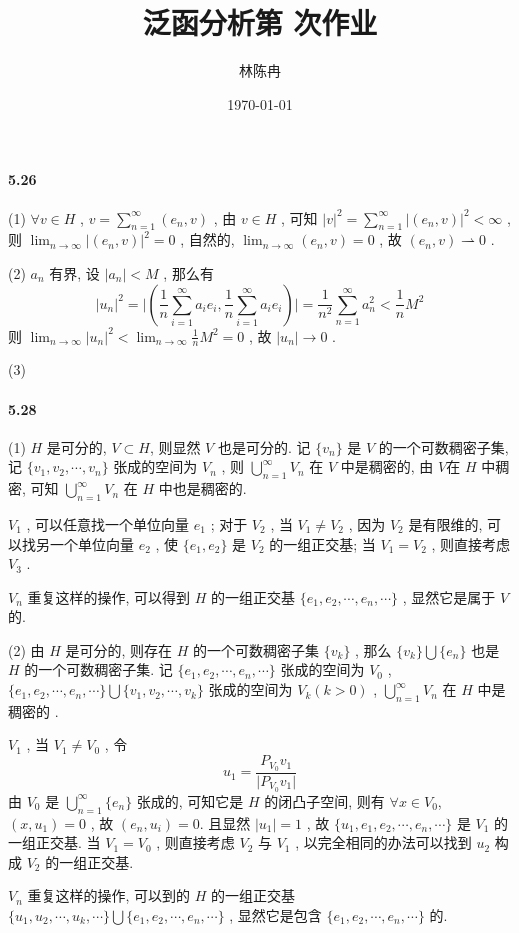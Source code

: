 \documentclass[UTF8]{ctexart}
\title{泛函分析第 次作业}
\author{林陈冉}
\date{\today}
\begin{document}
\maketitle
\paragraph{5.26}(1) $\forall v \in H$ , 
$v=\sum^{\infty}_{n=1}(e_n,v)$ , 
由 $v \in H$ , 
可知 $\vert v\vert^2=\sum^{\infty}_{n=1}\vert (e_n,v)\vert^2 < \infty$ , 
则 $\lim_{n\rightarrow\infty}\vert (e_n,v)\vert^2 = 0$ , 
自然的, $\lim_{n\rightarrow\infty}(e_n,v) = 0$ , 
故 $(e_n,v)\rightharpoonup 0$ .

\quad

\quad(2) ${a_n}$ 有界, 
设 $\vert a_n\vert < M$ , 那么有
\[\vert u_n\vert^2 = \vert (\frac{1}{n}\sum^{\infty}_{i=1}a_ie_i,\frac{1}{n}\sum^{\infty}_{i=1}a_ie_i)\vert = \frac{1}{n^2}\sum^{\infty}_{n=1}a_n^2 < \frac{1}{n}M^2\]
则 $\lim_{n \rightarrow \infty}\vert u_n\vert^2 < \lim_{n \rightarrow \infty}\frac{1}{n}M^2 = 0$ ,
故 $\vert u_n\vert \rightarrow 0$ .

\quad

\quad(3) 

\paragraph{5.28}(1) $H$ 是可分的, $V \subset H$, 则显然 $V$ 也是可分的.
记 $\{v_n\}$ 是 $V$ 的一个可数稠密子集, 
记 $\{v_1, v_2, \cdots, v_n\}$ 张成的空间为 $V_n$ , 则 $\bigcup^\infty_{n=1}V_n$ 在 $V$ 中是稠密的, 由 $V$在 $H$ 中稠密, 可知 $\bigcup^\infty_{n=1}V_n$ 在 $H$ 中也是稠密的.

 $V_1$ , 可以任意找一个单位向量 $e_1$ ; 
对于 $V_2$ , 当 $V_1\neq V_2$ , 
因为 $V_2$ 是有限维的, 可以找另一个单位向量 $e_2$ , 
使 $\{e_1, e_2\}$ 是 $V_2$ 的一组正交基;
当 $V_1= V_2$ , 则直接考虑 $V_3$ .

 $V_n$ 重复这样的操作, 可以得到 $H$ 的一组正交基 $\{e_1, e_2, \cdots, e_n, \cdots \}$ , 显然它是属于 $V$ 的.

\quad

\quad(2) 由 $H$ 是可分的, 则存在 $H$ 的一个可数稠密子集 $\{v_k\}$ ,
那么  $\{v_k\}\bigcup\{e_n\}$ 也是 $H$ 的一个可数稠密子集.
记 $\{e_1, e_2, \cdots, e_n, \cdots \}$ 张成的空间为 $V_0$ , 
$\{e_1, e_2, \cdots, e_n, \cdots \}\bigcup\{v_1, v_2, \cdots, v_k\}$ 张成的空间为 $V_k(k>0)$ , $\bigcup^\infty_{n=1}V_n$ 在 $H$ 中是稠密的 .

 $V_1$ , 当 $V_1\neq V_0$ , 令 
\[u_1=\frac{P_{V_0}v_1}{\vert P_{V_0}v_1\vert}\]
由 $V_0$ 是 $\bigcup^\infty_{n=1}\{e_n\}$ 张成的, 可知它是 $H$ 的闭凸子空间, 
则有 $\forall x\in V_0$, $(x, u_1)=0$ , 故 $ (e_n,u_i)=0$.
且显然 $\vert u_1\vert=1$ , 
故 $\{u_1, e_1, e_2, \cdots, e_n, \cdots \}$ 是 $V_1$ 的一组正交基.
当 $V_1 = V_0$ , 则直接考虑 $V_2$ 与 $V_1$ , 以完全相同的办法可以找到 $u_2$ 构成 $V_2$ 的一组正交基.

 $V_n$ 重复这样的操作, 可以到的 $H$ 的一组正交基 $\{u_1, u_2, \cdots, u_k, \cdots \}\bigcup\{e_1, e_2, \cdots, e_n, \cdots \}$ , 显然它是包含 $\{e_1, e_2, \cdots, e_n, \cdots \}$ 的.
\end{document}
